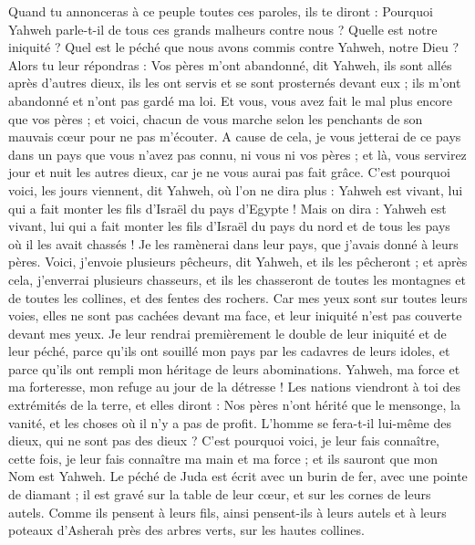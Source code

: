 \begin{multicols}{2}
Quand tu annonceras à ce peuple toutes ces paroles, ils te diront : Pourquoi Yahweh parle-t-il de tous ces grands malheurs contre nous ? Quelle est notre iniquité ? Quel est le péché que nous avons commis contre Yahweh, notre Dieu ?
Alors tu leur répondras : Vos pères m'ont abandonné, dit Yahweh, ils sont allés après d'autres dieux, ils les ont servis et se sont prosternés devant eux ; ils m'ont abandonné et n'ont pas gardé ma loi.
Et vous, vous avez fait le mal plus encore que vos pères ; et voici, chacun de vous marche selon les penchants de son mauvais cœur pour ne pas m'écouter.
A cause de cela, je vous jetterai de ce pays dans un pays que vous n'avez pas connu, ni vous ni vos pères ; et là, vous servirez jour et nuit les autres dieux, car je ne vous aurai pas fait grâce.
C’est pourquoi voici, les jours viennent, dit Yahweh, où l’on ne dira plus : Yahweh est vivant, lui qui a fait monter les fils d'Israël du pays d'Egypte !
Mais on dira : Yahweh est vivant, lui qui a fait monter les fils d'Israël du pays du nord et de tous les pays où il les avait chassés ! Je les ramènerai dans leur pays, que j'avais donné à leurs pères.
Voici, j’envoie plusieurs pêcheurs, dit Yahweh, et ils les pêcheront ; et après cela, j’enverrai plusieurs chasseurs, et ils les chasseront de toutes les montagnes et de toutes les collines, et des fentes des rochers.
Car mes yeux sont sur toutes leurs voies, elles ne sont pas cachées devant ma face, et leur iniquité n'est pas couverte devant mes yeux.
Je leur rendrai premièrement le double de leur iniquité et de leur péché, parce qu'ils ont souillé mon pays par les cadavres de leurs idoles, et parce qu'ils ont rempli mon héritage de leurs abominations.
Yahweh, ma force et ma forteresse, mon refuge au jour de la détresse ! Les nations viendront à toi des extrémités de la terre, et elles diront : Nos pères n’ont hérité que le mensonge, la vanité, et les choses où il n'y a pas de profit.
L'homme se fera-t-il lui-même des dieux, qui ne sont pas des dieux ?
C'est pourquoi voici, je leur fais connaître, cette fois, je leur fais connaître ma main et ma force ; et ils sauront que mon Nom est Yahweh.
\VerseOne{}Le péché de Juda est écrit avec un burin de fer, avec une pointe de diamant ; il est gravé sur la table de leur cœur, et sur les cornes de leurs autels.
Comme ils pensent à leurs fils, ainsi pensent-ils à leurs autels et à leurs poteaux d’Asherah près des arbres verts, sur les hautes collines.

\end{multicols}
